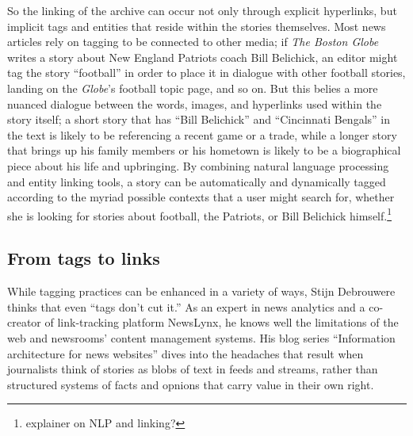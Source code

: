 So the linking of the archive can occur not only through explicit hyperlinks, but implicit tags and entities that reside within the stories themselves. Most news articles rely on tagging to be connected to other media; if \emph{The Boston Globe} writes a story about New England Patriots coach Bill Belichick, an editor might tag the story ``football'' in order to place it in dialogue with other football stories, landing on the \emph{Globe}'s football topic page, and so on. But this belies a more nuanced dialogue between the words, images, and hyperlinks used within the story itself; a short story that has ``Bill Belichick'' and ``Cincinnati Bengals'' in the text is likely to be referencing a recent game or a trade, while a longer story that brings up his family members or his hometown is likely to be a biographical piece about his life and upbringing. By combining natural language processing and entity linking tools, a story can be automatically and dynamically tagged according to the myriad possible contexts that a user might search for, whether she is looking for stories about football, the Patriots, or Bill Belichick himself.\footnote{explainer on NLP and linking?}

\subsection{From tags to links}

While tagging practices can be enhanced in a variety of ways, Stijn Debrouwere thinks that even ``tags don't cut it.''\autocite{debrouwere_tags_2010} As an expert in news analytics and a co-creator of link-tracking platform NewsLynx, he knows well the limitations of the web and newsrooms' content management systems. His blog series ``Information architecture for news websites'' dives into the headaches that result when journalists think of stories as blobs of text in feeds and streams, rather than structured systems of facts and opnions that carry value in their own right.\autocite{debrouwere_information_2010}

